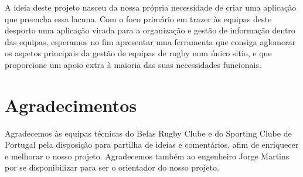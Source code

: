 \documentclass[a4paper,openright,11pt]{report} %
\begin{document}
A ideia deste projeto nasceu da nossa própria necessidade de criar uma aplicação que preencha essa lacuna. Com o foco primário em trazer às equipas deste desporto uma aplicação virada para a organização e gestão de informação dentro das equipas, esperamos no fim apresentar uma ferramenta que consiga aglomerar os aspetos principais da gestão de equipas de rugby num único sitio, e que proporcione um apoio extra à maioria das suas necessidades funcionais.


\cleardoublepage
\chapter*{Agradecimentos}
Agradecemos às equipas técnicas do Belas Rugby Clube e do Sporting Clube de Portugal pela disposição para partilha de ideias e comentários, afim de enriquecer e melhorar o nosso projeto. Agradecemos também ao engenheiro Jorge Martins por se disponibilizar para ser o orientador do nosso projeto.

\cleardoublepage
\tableofcontents \cleardoublepage

\listoffigures \cleardoublepage

\setcounter{page}{1}
















\appendix



\end{document}

